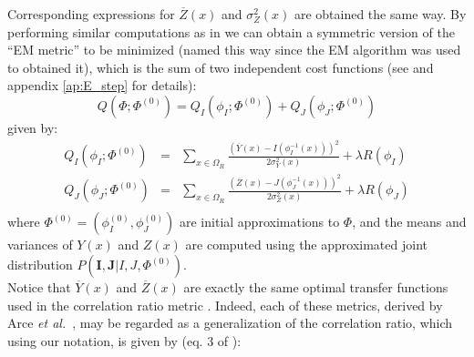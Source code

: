 Corresponding expressions for $\overline{Z}(x)$ and $\sigma_{Z}^{2}(x)$ are obtained the same way. By performing similar computations as in \cite{Arce-santana2014} we can obtain a symmetric version of the ``EM metric'' to be minimized (named this way since the EM algorithm was used to obtained it), which is the sum of two independent cost functions (see \cite{Arce-santana2014} and appendix \ref{ap:E_step} for details):
\begin{equation}\label{eq:SyNEM_energy}
    Q(\Phi; \Phi^{(0)}) = Q_{I}(\phi_{I}; \Phi^{(0)}) + Q_{J}(\phi_{J}; \Phi^{(0)})
\end{equation}
given by:
\begin{equation}\label{eq:SyNEM_energy_split}
    \begin{array}{lll}
        Q_{I}(\phi_{I}; \Phi^{(0)}) &=& \sum_{x \in \Omega_{R}} \frac{\left(\overline{Y}(x) - I(\phi_{I}^{-1}(x))\right)^{2}}{2\sigma^{2}_{Y}(x)} + \lambda R(\phi_{I}) \\
        Q_{J}(\phi_{J}; \Phi^{(0)}) &=& \sum_{x \in \Omega_{R}} \frac{\left(\overline{Z}(x) - J(\phi_{J}^{-1}(x))\right)^{2}}{2\sigma^{2}_{Z}(x)} + \lambda R(\phi_{J}) \\
    \end{array}
\end{equation}
where $\Phi^{(0)} = (\phi_{I}^{(0)}, \phi_{J}^{(0)})$ are initial approximations to $\Phi$, and the means and variances of $Y(x)$ and $Z(x)$ are computed using the approximated joint distribution $P(\mathbf{I}, \mathbf{J} | I, J, \Phi^{(0)})$.\\

Notice that $\overline{Y}(x)$ and $\overline{Z}(x)$ are exactly the same optimal transfer functions used in the correlation ratio metric \cite{Roche1998} \cite{Roche2000}. Indeed, each of these metrics, derived by Arce {\it et al.}~\cite{Arce-santana2014}, may be regarded as a generalization of the correlation ratio, which using our notation, is given by (eq. 3 of \cite{Roche1998}):

